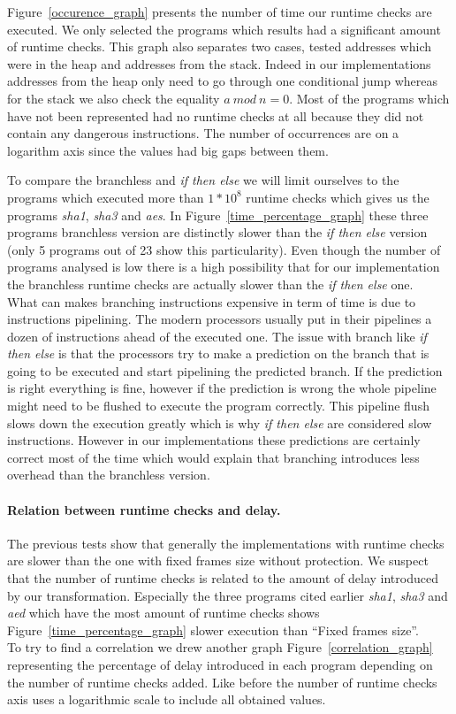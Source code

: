 \documentclass[11pt]{sdm}
\begin{document}
Figure~\ref{occurence_graph} presents the number of time our runtime checks are executed. We only selected the programs which results had a significant amount of runtime checks. This graph also separates two cases, tested addresses which were in the heap and addresses from the stack. Indeed in our implementations addresses from the heap only need to go through one conditional jump whereas for the stack we also check the equality $a~mod~n=0$.
Most of the programs which have not been represented had no runtime checks at all because they did not contain any dangerous instructions.
The number of occurrences are on a logarithm axis since the values had big gaps between them.

To compare the branchless and \textit{if then else} we will limit ourselves to the programs which executed more than $1*10^8$ runtime checks which gives us the programs \textit{sha1}, \textit{sha3} and \textit{aes}. In Figure~\ref{time_percentage_graph} these three programs branchless version are distinctly slower than the \textit{if then else} version (only 5 programs out of 23 show this particularity). Even though the number of programs analysed is low there is a high possibility that for our implementation the branchless runtime checks are actually slower than the \textit{if then else} one.\\
What can makes branching instructions expensive in term of time is due to instructions pipelining. 
The modern processors usually put in their pipelines a dozen of instructions ahead of the executed one. 
The issue with branch like \textit{if then else} is that the processors try to make a prediction on the branch that is going to be executed and start pipelining the predicted branch.
If the prediction is right everything is fine, however if the prediction is wrong the whole pipeline might need to be flushed to execute the program correctly. This pipeline flush slows down the execution greatly which is why \textit{if then else} are considered slow instructions.
However in our implementations these predictions are certainly correct most of the time which would explain that branching introduces less overhead than the branchless version.

\paragraph{Relation between runtime checks and delay.}

The previous tests show that generally the implementations with runtime checks are slower than the one with fixed frames size without protection. We suspect that the number of runtime checks is related to the amount of delay introduced by our transformation. 
Especially the three programs cited earlier \textit{sha1}, \textit{sha3} and \textit{aed} which have the most amount of runtime checks shows Figure~\ref{time_percentage_graph} slower execution than ``Fixed frames size''. \\
To try to find a correlation we drew another graph Figure~\ref{correlation_graph} representing the percentage of delay introduced in each program depending on the number of runtime checks added. Like before the number of runtime checks axis uses a logarithmic scale to include all obtained values.
\end{document}
